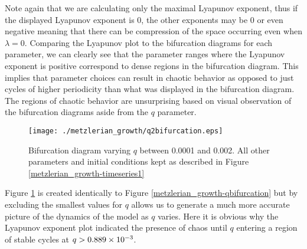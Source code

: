 Note again that we are calculating only the maximal Lyapunov exponent, thus if the displayed Lyapunov exponent is 0, the other exponents may be 0 or even negative meaning that there can be compression of the space occurring even when $\lambda=0$. Comparing the Lyapunov plot to the bifurcation diagrams for each parameter, we can clearly see that the parameter ranges where the Lyapunov exponent is positive correspond to dense regions in the bifurcation diagram. This implies that parameter choices can result in chaotic behavior as opposed to just cycles of higher periodicity than what was displayed in the bifurcation diagram. The regions of chaotic behavior are unsurprising based on visual observation of the bifurcation diagrams aside from the $q$ parameter.
\begin{figure}
    \centering
    \texttt{[image: ./metzlerian\_growth/q2bifurcation.eps]}
    \caption{Bifurcation diagram varying $q$ between 0.0001 and 0.002. All other parameters and initial conditions kept as described in Figure \ref{metzlerian_growth-timeseries1}}
    \label{metzlerian_growth-qbifurcation_zoom}
\end{figure}
Figure \ref{metzlerian_growth-qbifurcation_zoom} is created identically to Figure \ref{metzlerian_growth-qbifurcation} but by excluding the smallest values for $q$ allows us to generate a much more accurate picture of the dynamics of the model as $q$ varies. Here it is obvious why the Lyapunov exponent plot indicated the presence of chaos until $q$ entering a region of stable cycles at $q>\num{0.889d-3}$.











